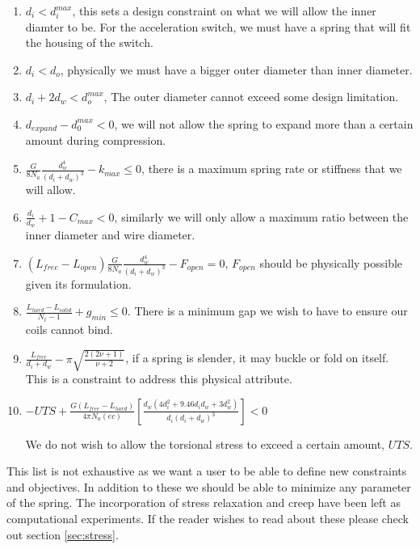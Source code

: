 \documentclass[10pt]{article}
\begin{document}
\begin{enumerate}
\item $d_{i} < d_{i}^{max}$, this sets a design constraint on what we will allow the inner diamter to be. For the acceleration switch, we must have a spring that will fit the housing of the switch.
\item $d_{i} < d_{o}$, physically we must have a bigger outer diameter than inner diameter.
\item $d_{i} + 2d_{w} < d_{o}^{max}$, The outer diameter cannot exceed some design limitation.
\item$d_{expand} - d_{0}^{max} < 0 $, we will not allow the spring to expand more than a certain amount during compression.
\item$ \frac{G}{8N_{a}}\frac{d_{w}^{4}}{(d_{i} + d_{w})^{3}} - k_{max} \le 0 $, there is a maximum spring rate or stiffness that we will allow. 

\item $\frac{d_{i}}{d_{w}} + 1 - C_{max}< 0$, similarly we will only allow a maximum ratio between the inner diameter and wire diameter. 

\item $(L_{free} - L_{open})\frac{G}{8N_{a}}\frac{d_{w}^{4}}{(d_{i} + d_{w})^{3}} - F_{open} = 0 $, $F_{open}$ should be physically possible given its formulation.

\item $\frac{L_{hard} - L_{solid}}{N_{t} - 1} + g_{min} \le  0$. There is a minimum gap we wish to have to ensure our coils cannot bind. 

\item$\frac{L_{free}}{d_{i} + d_{w}} - \pi \sqrt{\frac{2(2 \nu + 1)}{\nu + 2}}$, if a spring is slender, it may buckle or fold on itself. This is a constraint to address this physical attribute. 

\item$-UTS + \frac{G(L_{free} - L_{hard})}{4 \pi N_{a} (ec)} \left[\frac{d_{w} (4d_{i}^{2} + 9.46d_{i} 
d_{w} + 3 d_{w}^{2})}{d_{i}(d_{i}+d_{w})^{3}}\right] < 0$

We do not wish to allow the torsional stress to exceed a certain amount, $UTS$.

\end{enumerate}	

This list is not exhaustive as we want a user to be able to define new constraints and objectives. 
In addition to these we should be able to minimize any parameter of the spring. The incorporation of stress relaxation and creep have been left as computational experiments. If the reader wishes to read about these please check out section \ref{sec:stress}. 
\end{document}
